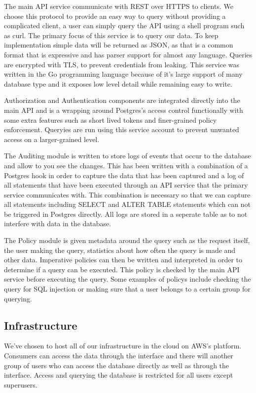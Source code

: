 \documentclass[sigconf]{acmart}
\begin{document}
 The main API service communicate with REST over HTTPS to clients. We choose this protocol to provide an easy way to query without providing a complicated client, a user can simply query the API using a shell program such as curl. The primary focus of this service is to query our data. To keep implementation simple data will be returned as JSON, as that is a common format that is expressive and has parser support for almost any language. Queries are encrypted with TLS, to prevent credentials from leaking. This service was written in the Go programming language because of it's large support of many database type and it exposes low level detail while remaining easy to write.
 
 Authorization and Authentication components are integrated directly into the main API and is a wrapping around Postgres's access control functionally with some extra features such as short lived tokens and finer-grained policy enforcement. Queryies are run using this service account to prevent unwanted access on a larger-grained level.
 
 The Auditing module is written to store logs of events that occur to the database and allow to you see the changes. This has been written with a combination of a Postgres hook in order to capture the data that has been captured and a log of all statements that have been executed through an API service that the primary service communicates with. This combination is necessary so that we can capture all statements including SELECT and ALTER TABLE statements which can not be triggered in Postgres directly. All logs are stored in a seperate table as to not interfere with data in the database.
 
 The Policy module is given metadata around the query such as the request itself, the user making the query, statistics about how often the query is made and other data. Imperative policies can then be written and interpreted in order to determine if a query can be executed. This policy is checked by the main API service before executing the query. Some examples of policys include checking the query for SQL injection or making sure that a user belongs to a certain group for querying.

\subsection{Infrastructure}
 We've chosen to host all of our infrastructure in the cloud on AWS's platform. Consumers can access the data through the interface and there will another group of users who can access the database directly as well as through the interface. Access and querying the database is restricted for all users except superusers.
 
\end{document}
